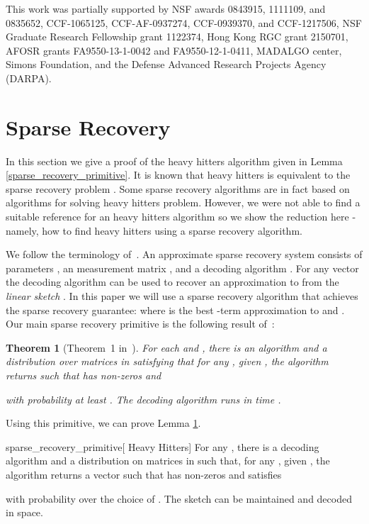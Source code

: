 \documentclass[11pt]{article}
\newtheorem{theorem}{Theorem}
\begin{document}
This work was partially supported by NSF awards 0843915, 1111109, and 0835652, CCF-1065125, CCF-AF-0937274,  CCF-0939370,  and CCF-1217506, NSF Graduate Research Fellowship grant 1122374, Hong Kong RGC grant 2150701, AFOSR grants FA9550-13-1-0042 and FA9550-12-1-0411, MADALGO center, Simons Foundation, and the Defense Advanced Research Projects Agency (DARPA).

{}


\appendix


\section{Sparse Recovery}\label{sparse_recovery_appendix}
In this section we give a proof of the  heavy hitters algorithm given in Lemma \ref{sparse_recovery_primitive}. It is known that  heavy hitters is equivalent to the  sparse recovery problem \cite{gilbert2010sparse}. Some sparse recovery algorithms are in fact based on algorithms for solving heavy hitters problem. However, we were not able to find a suitable reference for an  heavy hitters algorithm so we show the reduction here - namely, how to find  heavy hitters using a sparse recovery algorithm. 

We follow the terminology of~\cite{gilbert-stoc2010}. An approximate sparse recovery system consists of parameters , an  measurement matrix , and a decoding algorithm . For any vector  the decoding algorithm  can be used to recover an approximation  to  from the {\em linear sketch} . In this paper  we will use a sparse recovery algorithm that achieves the  sparse recovery guarantee:
where  is the best -term approximation to  and .  Our main sparse recovery primitive is the following result of~\cite{gilbert-stoc2010}:
\begin{theorem}[Theorem~1 in~\cite{gilbert-stoc2010}]\label{thm:l2l2}
For each  and , there is an algorithm and a distribution  over matrices in  satisfying that for any , given , the algorithm returns  such that  has  non-zeros and 

with probability at least .
The decoding algorithm runs in time .
\end{theorem}

Using this primitive, we can prove Lemma \ref{sparse_recovery_appendix}.

\begin{replemma}{sparse_recovery_primitive}[ Heavy Hitters]
For any , there is a decoding algorithm  and a distribution on matrices  in  such that, for any , given , the algorithm  returns a vector  such that
 has  non-zeros and satisfies

with probability  over the choice of . The sketch  can be maintained and decoded in  space. 
\end{replemma}
\end{document}
